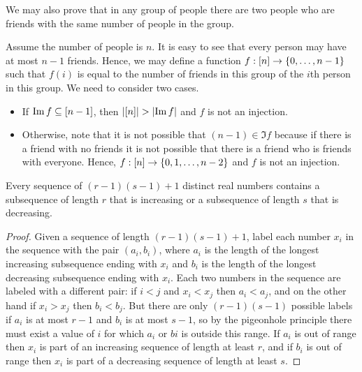 We may also prove that in any group of people there are two people who are
friends with the same number of people in the group.

Assume the number of people is $n$. It is easy to see that every person may
have at most $n - 1$ friends. Hence, we may define a function $f: \range{n} \to
\set{0, \dots, n - 1}$ such that $f(i)$ is equal to the number of friends in
this group of the $i$th person in this group.
We need to consider two cases.
\begin{itemize}
  \item If $\operatorname{Im} f \subseteq {[{n - 1}]}$, then
    $\left|{{[{n}]}}\right| > \left|{\operatorname{Im} f}\right|$ and $f$ is not an injection.
  \item Otherwise, note that it is not possible that $(n - 1) \in \Im f$
    because if there is a friend with no friends it is not possible that there
    is a friend who is friends with everyone. Hence,
    $f : \range{n} \to \set{0, 1, \dots, n - 2}$ and $f$ is not an injection.
\end{itemize}

\begin{theorem}
  Every sequence of $(r - 1)(s - 1) + 1$ distinct real numbers contains a
  subsequence of length $r$ that is increasing or a
  subsequence of length $s$ that is decreasing.
\end{theorem}
\begin{proof}
  Given a sequence of length $(r - 1)(s - 1) + 1$, label each number $x_i$ in
  the sequence with the pair $(a_i, b_i)$, where $a_i$ is the length of the
  longest increasing subsequence ending with $x_i$ and $b_i$ is
  the length of the longest decreasing subsequence ending with $x_i$.
  Each two numbers in the sequence are labeled with a different pair: if $i < j$
  and $x_i < x_j$ then $a_i < a_j$, and on the other hand if $x_i > x_j$ then
  $b_i < b_j$. But there are only $(r - 1)(s - 1)$ possible labels if $a_i$ is
  at most $r - 1$ and $b_i$ is at most $s - 1$, so by the pigeonhole principle
  there must exist a value of $i$ for which $a_i$ or $bi$ is outside this
  range. If $a_i$ is out of range then $x_i$ is part of an increasing sequence of
  length at least $r$, and if $b_i$ is out of range then $x_i$ is part of a
  decreasing sequence of length at least $s$.
\end{proof}

